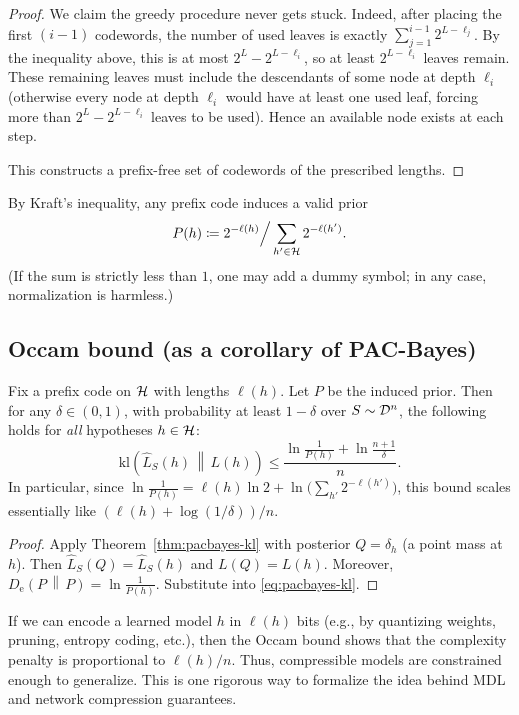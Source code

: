 \documentclass{article}
\numberwithin{equation}{section}
\newcommand{\kl}[2]{\mathrm{kl}\!\left(#1\,\middle\|\,#2\right)}
\newcommand{\KLnat}[2]{D_{\mathrm{e}}\!\left(#2\,\middle\|\,#2\right)}
\newcommand{\cD}{{\cal D}}
\newcommand{\cH}{{\cal H}}
\begin{document}
\begin{proof}
We claim the greedy procedure never gets stuck.
Indeed, after placing the first $(i-1)$ codewords, the number of used leaves is exactly
\(\sum_{j=1}^{i-1} 2^{L-\ell_j}\).
By the inequality above, this is at most $2^L-2^{L-\ell_i}$, so at least $2^{L-\ell_i}$ leaves remain.
These remaining leaves must include the descendants of some node at depth $\ell_i$ (otherwise every node at depth $\ell_i$ would have at least one used leaf, forcing more than $2^L-2^{L-\ell_i}$ leaves to be used).
Hence an available node exists at each step.

This constructs a prefix-free set of codewords of the prescribed lengths.
\end{proof}

By Kraft's inequality, any prefix code induces a valid prior
\begin{equation}
    P(h) \coloneqq 2^{-\ell(h)} \Big/ \sum_{h'\in\cH} 2^{-\ell(h')}.
\end{equation}
(If the sum is strictly less than $1$, one may add a dummy symbol; in any case, normalization is harmless.)

\subsection{Occam bound (as a corollary of PAC-Bayes)}

\begin{corollary}
\label{cor:occam}
Fix a prefix code on $\cH$ with lengths $\ell(h)$.
Let $P$ be the induced prior.
Then for any $\delta\in(0,1)$, with probability at least $1-\delta$ over $S\sim\cD^n$, the following holds for \emph{all} hypotheses $h\in\cH$:
\begin{equation}
\label{eq:occam-kl}
    \kl{\hat L_S(h)}{L(h)}
    \le \frac{\ln\frac{1}{P(h)} + \ln\frac{n+1}{\delta}}{n}.
\end{equation}
In particular, since $\ln\frac{1}{P(h)} = \ell(h)\ln 2 + \ln\Big(\sum_{h'}2^{-\ell(h')}\Big)$,
this bound scales essentially like $(\ell(h)+\log(1/\delta))/n$.
\end{corollary}
\begin{proof}
Apply Theorem~\ref{thm:pacbayes-kl} with posterior $Q=\delta_h$ (a point mass at $h$).
Then $\hat L_S(Q)=\hat L_S(h)$ and $L(Q)=L(h)$.
Moreover,
\(\KLnat{\delta_h}{P} = \ln\frac{1}{P(h)}\).
Substitute into \eqref{eq:pacbayes-kl}.
\end{proof}

\begin{remark}
If we can encode a learned model $h$ in $\ell(h)$ bits (e.g., by quantizing weights, pruning, entropy coding, etc.), then the Occam bound shows that the complexity penalty is proportional to $\ell(h)/n$.
Thus, compressible models are constrained enough to generalize.
This is one rigorous way to formalize the idea behind MDL and network compression guarantees.
\end{remark}
\end{document}
